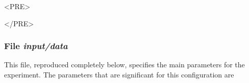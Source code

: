 \begin{rawhtml}<PRE>\end{rawhtml}
\begin{small}

\end{small}
\begin{rawhtml}</PRE>\end{rawhtml}

\subsubsection{File {\it input/data}}
\label{www:tutorials}

This file, reproduced completely below, specifies the main parameters 
for the experiment. The parameters that are significant for this configuration
are

